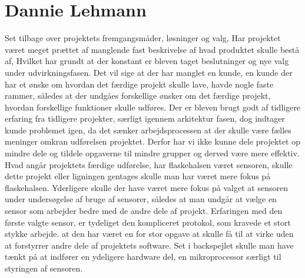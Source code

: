 

\section{Dannie Lehmann}

Set tilbage over projektets fremgangsmåder, løsninger og valg, Har projektet været meget prættet af manglende fast beskrivelse af hvad produktet skulle bestå af, Hvilket har grundt at der konstant er bleven taget beslutninger og nye valg under udvirkningsfasen. Det vil sige at der har manglet en kunde, en kunde der har et ønske om hvordan det færdige projekt skulle lave, havde nogle faste rammer, således at der undgåes forskellige ønsker om det færdige projekt, hvordan forskellige funktioner skulle udføres. 
Der er bleven brugt godt af tidligere erfaring fra tidligere projekter, særligt igennem arkitektur fasen, dog indtager kunde problemet igen, da det sænker arbejdsprocessen at der skulle være fælles meninger omkran udførelsen projektet. Derfor har vi ikke kunne dele projektet op mindre dele og tildele opgaverne til mindre grupper og derved være mere effektiv. 
Hvad angår projektets færdige udførelse, har flaskehalsen været sensoren, skulle dette projekt eller ligningen gentages skulle man har været mere fokus på flaskehalsen. Yderligere skulle der have været mere fokus på valget at sensoren under undersøgelse af bruge af sensorer, således at man undgår at vælge en sensor som arbejder bedre med de andre dele af projekt. Erfaringen med den første valgte sensor, er tydeliget den kompliceret protokol, som kravede et stort stykke arbejde. at den har været en for stor opgave at skulle få til at virke uden at forstyrrer andre dele af projektets software. Set i backspejlet skulle man have tænkt på at indfører en ydeligere hardware del, en mikroprocessor særligt til styringen af sensoren.
